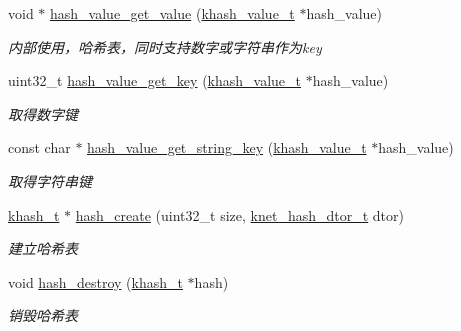 \begin{DoxyCompactItemize}
void $\ast$ \hyperlink{a00067_aab909a28870f824900d55d4158ecf807_aab909a28870f824900d55d4158ecf807}{hash\+\_\+value\+\_\+get\+\_\+value} (\hyperlink{a00056_aa13ac88a5567525fe44f3670134c3d96_aa13ac88a5567525fe44f3670134c3d96}{khash\+\_\+value\+\_\+t} $\ast$hash\+\_\+value)
\begin{DoxyCompactList}\small\item\em 内部使用，哈希表，同时支持数字或字符串作为key \end{DoxyCompactList}\item 
uint32\+\_\+t \hyperlink{a00067_ae2eae4207ed7825a923eb744b1b03be0_ae2eae4207ed7825a923eb744b1b03be0}{hash\+\_\+value\+\_\+get\+\_\+key} (\hyperlink{a00056_aa13ac88a5567525fe44f3670134c3d96_aa13ac88a5567525fe44f3670134c3d96}{khash\+\_\+value\+\_\+t} $\ast$hash\+\_\+value)
\begin{DoxyCompactList}\small\item\em 取得数字键 \end{DoxyCompactList}\item 
const char $\ast$ \hyperlink{a00067_ae64de86e8fdc8f5e278cebe0f9856c09_ae64de86e8fdc8f5e278cebe0f9856c09}{hash\+\_\+value\+\_\+get\+\_\+string\+\_\+key} (\hyperlink{a00056_aa13ac88a5567525fe44f3670134c3d96_aa13ac88a5567525fe44f3670134c3d96}{khash\+\_\+value\+\_\+t} $\ast$hash\+\_\+value)
\begin{DoxyCompactList}\small\item\em 取得字符串键 \end{DoxyCompactList}\item 
\hyperlink{a00056_aa242a9a673d8677076543d5768798f2c_aa242a9a673d8677076543d5768798f2c}{khash\+\_\+t} $\ast$ \hyperlink{a00067_aa4a5b9547c52b16f292c317a41f69d24_aa4a5b9547c52b16f292c317a41f69d24}{hash\+\_\+create} (uint32\+\_\+t size, \hyperlink{a00056_af806592520383146be2f3aac316beb45_af806592520383146be2f3aac316beb45}{knet\+\_\+hash\+\_\+dtor\+\_\+t} dtor)
\begin{DoxyCompactList}\small\item\em 建立哈希表 \end{DoxyCompactList}\item 
void \hyperlink{a00067_a7c2257af49b4f207001c43e43514a226_a7c2257af49b4f207001c43e43514a226}{hash\+\_\+destroy} (\hyperlink{a00056_aa242a9a673d8677076543d5768798f2c_aa242a9a673d8677076543d5768798f2c}{khash\+\_\+t} $\ast$hash)
\begin{DoxyCompactList}\small\item\em 销毁哈希表 \end{DoxyCompactList}\item 

\end{DoxyCompactItemize}
